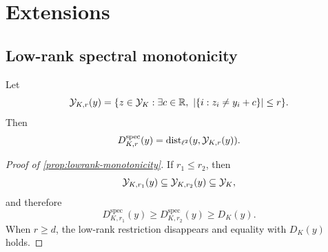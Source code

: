 \section{Extensions}
\label{app:extensions}

\subsection{Low-rank spectral monotonicity}

Let
\[
  \mathcal Y_{K,r}(y)
  =
  \{z\in\mathcal Y_K:\exists c\in\mathbb R,\ |\{i:z_i\ne y_i+c\}|\le r\}.
\]
Then
\[
  D_{K,r}^{\mathrm{spec}}(y)
  =
  \operatorname{dist}_{\ell^2}(y,\mathcal Y_{K,r}(y)).
\]
\begin{proof}[Proof of \cref{prop:lowrank-monotonicity}]
If \(r_1\le r_2\), then
\[
  \mathcal Y_{K,r_1}(y)\subseteq \mathcal Y_{K,r_2}(y)\subseteq \mathcal Y_K,
\]
and therefore
\[
  D_{K,r_1}^{\mathrm{spec}}(y)
  \ge
  D_{K,r_2}^{\mathrm{spec}}(y)
  \ge
  D_K(y).
\]
When \(r\ge d\), the low-rank restriction disappears and equality with
\(D_K(y)\) holds.
\end{proof}
